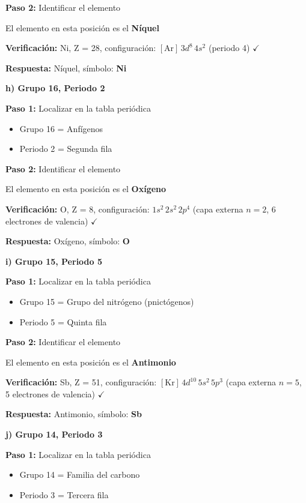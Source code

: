\begin{exercise}
\begin{solu}
        \textbf{Paso 2:} Identificar el elemento

        El elemento en esta posición es el \textbf{Níquel}

        \textbf{Verificación:} Ni, Z = 28, configuración: \([\text{Ar}] \, 3d^8 \, 4s^2\) (periodo 4) \(\checkmark\)

        \textbf{Respuesta:} Níquel, símbolo: \textbf{Ni}

        \textbf{h) Grupo 16, Periodo 2}

        \textbf{Paso 1:} Localizar en la tabla periódica
        \begin{itemize}
            \item Grupo 16 = Anfígenos
            \item Periodo 2 = Segunda fila
        \end{itemize}

        \textbf{Paso 2:} Identificar el elemento

        El elemento en esta posición es el \textbf{Oxígeno}

        \textbf{Verificación:} O, Z = 8, configuración: \(1s^2 \, 2s^2 \, 2p^4\) (capa externa \(n = 2\), 6 electrones de valencia) \(\checkmark\)

        \textbf{Respuesta:} Oxígeno, símbolo: \textbf{O}

        \textbf{i) Grupo 15, Periodo 5}

        \textbf{Paso 1:} Localizar en la tabla periódica
        \begin{itemize}
            \item Grupo 15 = Grupo del nitrógeno (pnictógenos)
            \item Periodo 5 = Quinta fila
        \end{itemize}

        \textbf{Paso 2:} Identificar el elemento

        El elemento en esta posición es el \textbf{Antimonio}

        \textbf{Verificación:} Sb, Z = 51, configuración: \([\text{Kr}] \, 4d^{10} \, 5s^2 \, 5p^3\) (capa externa \(n = 5\), 5 electrones de valencia) \(\checkmark\)

        \textbf{Respuesta:} Antimonio, símbolo: \textbf{Sb}

        \textbf{j) Grupo 14, Periodo 3}

        \textbf{Paso 1:} Localizar en la tabla periódica
        \begin{itemize}
            \item Grupo 14 = Familia del carbono
            \item Periodo 3 = Tercera fila
        \end{itemize}


\end{solu}
\end{exercise}
